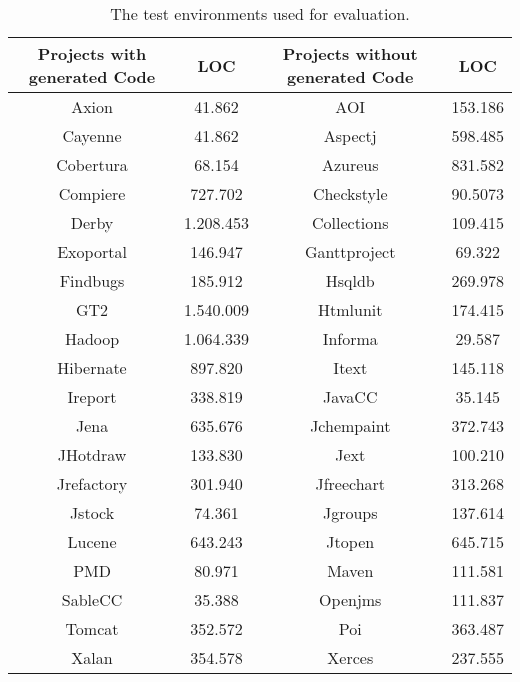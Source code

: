 
\setlength{\extrarowheight}{0pt}

\begin{table}
	\caption{The test environments used for evaluation. \cite{Bernwieser2014}}
	\label{table:qualitasCorpusOverview}
	\begin{tabularx}{\textwidth}{Cc||Cc}
		\textbf{Projects with generated Code} & \textbf{LOC} & \textbf{Projects without generated Code} & \textbf{LOC} \\
		\hline
		Axion & 41.862 & AOI & 153.186 \\
		Cayenne & 41.862 & Aspectj & 598.485 \\
		Cobertura & 68.154 & Azureus & 831.582 \\
		Compiere & 727.702 & Checkstyle & 90.5073 \\
		Derby & 1.208.453 & Collections & 109.415 \\
		Exoportal & 146.947 & Ganttproject & 69.322 \\
		Findbugs & 185.912 & Hsqldb & 269.978 \\
		GT2 & 1.540.009 & Htmlunit & 174.415 \\
		Hadoop & 1.064.339 & Informa & 29.587 \\
		Hibernate & 897.820 & Itext & 145.118 \\
		Ireport & 338.819 & JavaCC & 35.145 \\
		Jena & 635.676 & Jchempaint & 372.743 \\
		JHotdraw & 133.830 & Jext & 100.210 \\
		Jrefactory & 301.940 & Jfreechart & 313.268 \\
		Jstock & 74.361 & Jgroups & 137.614 \\
		Lucene & 643.243 & Jtopen & 645.715 \\
		PMD & 80.971 & Maven & 111.581 \\
		SableCC & 35.388 & Openjms & 111.837 \\
		Tomcat & 352.572 & Poi & 363.487 \\
		Xalan & 354.578 & Xerces & 237.555 \\
	\end{tabularx}
\end{table}

\setlength{\extrarowheight}{0.5em}